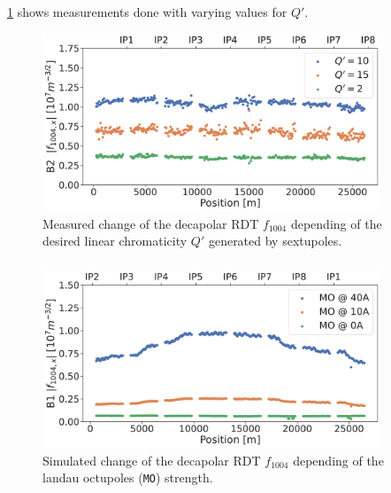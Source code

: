 \cref{decapoles:rdts:measured_f1004_from_sextupoles} shows measurements done with varying values
for $Q'$. 

\begin{figure}[H]
    \centering
    \includegraphics[width=0.9\textwidth]{./images/f1004/f1004x_q2_q10_q15.pdf}
    \caption{Measured change of the decapolar RDT $f_{1004}$ depending of the desired linear
    chromaticity $Q'$ generated by sextupoles.}
    \label{decapoles:rdts:measured_f1004_from_sextupoles}
\end{figure}


\subsubsection{}

\begin{figure}[H]
    \centering
    \includegraphics[width=0.9\textwidth]{./images/f1004/f1004_mo.pdf}
    \caption{Simulated change of the decapolar RDT $f_{1004}$ depending of the landau octupoles 
    (\texttt{MO}) strength.}
    \label{}
\end{figure}

